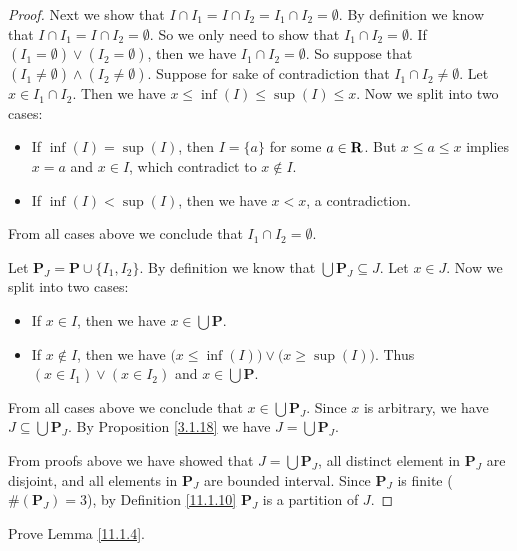 \begin{proof}
    Next we show that \(I \cap I_1 = I \cap I_2 = I_1 \cap I_2 = \emptyset\).
    By definition we know that \(I \cap I_1 = I \cap I_2 = \emptyset\).
    So we only need to show that \(I_1 \cap I_2 = \emptyset\).
    If \((I_1 = \emptyset) \lor (I_2 = \emptyset)\), then we have \(I_1 \cap I_2 = \emptyset\).
    So suppose that \((I_1 \neq \emptyset) \land (I_2 \neq \emptyset)\).
    Suppose for sake of contradiction that \(I_1 \cap I_2 \neq \emptyset\).
    Let \(x \in I_1 \cap I_2\).
    Then we have \(x \leq \inf(I) \leq \sup(I) \leq x\).
    Now we split into two cases:
    \begin{itemize}
        \item If \(\inf(I) = \sup(I)\), then \(I = \{a\}\) for some \(a \in \mathbf{R}\).
              But \(x \leq a \leq x\) implies \(x = a\) and \(x \in I\), which contradict to \(x \notin I\).
        \item If \(\inf(I) < \sup(I)\), then we have \(x < x\), a contradiction.
    \end{itemize}
    From all cases above we conclude that \(I_1 \cap I_2 = \emptyset\).

    Let \(\mathbf{P}_J = \mathbf{P} \cup \{I_1, I_2\}\).
    By definition we know that \(\bigcup \mathbf{P}_J \subseteq J\).
    Let \(x \in J\).
    Now we split into two cases:
    \begin{itemize}
        \item If \(x \in I\), then we have \(x \in \bigcup \mathbf{P}\).
        \item If \(x \notin I\), then we have \(\big(x \leq \inf(I)\big) \lor \big(x \geq \sup(I)\big)\).
              Thus \((x \in I_1) \lor (x \in I_2)\) and \(x \in \bigcup \mathbf{P}\).
    \end{itemize}
    From all cases above we conclude that \(x \in \bigcup \mathbf{P}_J\).
    Since \(x\) is arbitrary, we have \(J \subseteq \bigcup \mathbf{P}_J\).
    By Proposition \ref{3.1.18} we have \(J = \bigcup \mathbf{P}_J\).

    From proofs above we have showed that \(J = \bigcup \mathbf{P}_J\), all distinct element in \(\mathbf{P}_J\) are disjoint, and all elements in \(\mathbf{P}_J\) are bounded interval.
    Since \(\mathbf{P}_J\) is finite (\(\#(\mathbf{P}_J) = 3\)), by Definition \ref{11.1.10} \(\mathbf{P}_J\) is a partition of \(J\).
\end{proof}

\exercisesection

\begin{exercise}\label{ex 11.1.1}
    Prove Lemma \ref{11.1.4}.
\end{exercise}

